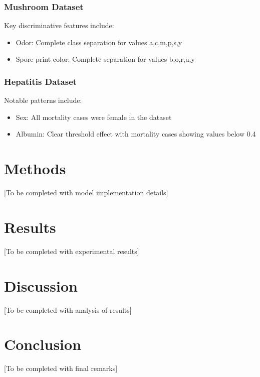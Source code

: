 \subsubsection{Mushroom Dataset}
Key discriminative features include:
\begin{itemize}
    \item Odor: Complete class separation for values a,c,m,p,s,y
    \item Spore print color: Complete separation for values b,o,r,u,y
\end{itemize}

\subsubsection{Hepatitis Dataset}
Notable patterns include:
\begin{itemize}
    \item Sex: All mortality cases were female in the dataset
    \item Albumin: Clear threshold effect with mortality cases showing values below 0.4
\end{itemize}

\section{Methods}
[To be completed with model implementation details]

\section{Results}
[To be completed with experimental results]

\section{Discussion}
[To be completed with analysis of results]

\section{Conclusion}
[To be completed with final remarks]

